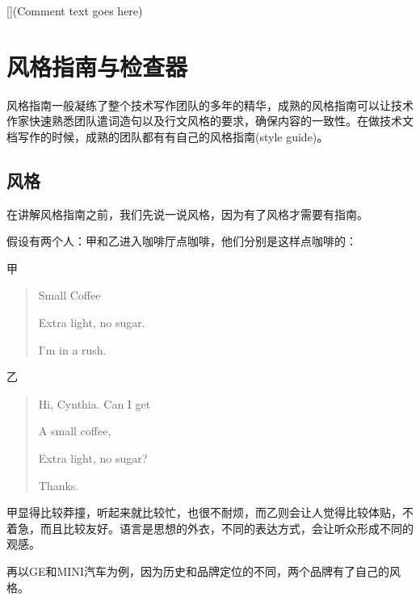 \documentclass[letterpaper,10pt,english]{sphinxmanual}
\begin{document}
\sphinxAtStartPar
{[}{]}(Comment text goes here)

\sphinxstepscope


\chapter{风格指南与检查器}
\label{\detokenize{doc-quality/style-guide:id1}}\label{\detokenize{doc-quality/style-guide::doc}}
\sphinxAtStartPar
风格指南一般凝练了整个技术写作团队的多年的精华，成熟的风格指南可以让技术作家快速熟悉团队遣词造句以及行文风格的要求，确保内容的一致性。在做技术文档写作的时候，成熟的团队都有有自己的风格指南(style guide)。


\section{风格}
\label{\detokenize{doc-quality/style-guide:id2}}
\sphinxAtStartPar
在讲解风格指南之前，我们先说一说风格，因为有了风格才需要有指南。

\sphinxAtStartPar
假设有两个人：甲和乙进入咖啡厅点咖啡，他们分别是这样点咖啡的：

\sphinxAtStartPar
甲
\begin{quote}

\sphinxAtStartPar
Small Coffee

\sphinxAtStartPar
Extra light, no sugar.

\sphinxAtStartPar
I’m in a rush.
\end{quote}

\sphinxAtStartPar
乙
\begin{quote}

\sphinxAtStartPar
Hi, Cynthia. Can I get

\sphinxAtStartPar
A small coffee,

\sphinxAtStartPar
Extra light, no sugar?

\sphinxAtStartPar
Thanks.
\end{quote}

\sphinxAtStartPar
甲显得比较莽撞，听起来就比较忙，也很不耐烦，而乙则会让人觉得比较体贴，不着急，而且比较友好。语言是思想的外衣，不同的表达方式，会让听众形成不同的观感。

\sphinxAtStartPar
再以GE和MINI汽车为例，因为历史和品牌定位的不同，两个品牌有了自己的风格。
\end{document}
